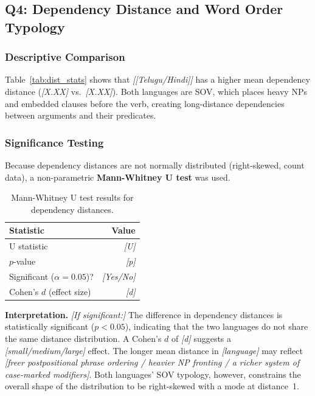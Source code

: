 \documentclass[12pt,a4paper]{article}
\newcommand{\placeholder}[1]{\textcolor{red!70!black}{\textit{[#1]}}}
\begin{document}
\subsection{Q4: Dependency Distance and Word Order Typology}

\subsubsection*{Descriptive Comparison}

Table~\ref{tab:dist_stats} shows that \placeholder{[Telugu/Hindi]} has a
higher mean dependency distance (\placeholder{X.XX} vs.\ \placeholder{X.XX}).
Both languages are SOV, which places heavy NPs and embedded clauses before the
verb, creating long-distance dependencies between arguments and their predicates.

\subsubsection*{Significance Testing}

Because dependency distances are not normally distributed (right-skewed, count
data), a non-parametric \textbf{Mann-Whitney U test} was used.

\begin{table}[H]
\centering
\caption{Mann-Whitney U test results for dependency distances.}
\begin{tabular}{lr}
\toprule
\textbf{Statistic} & \textbf{Value} \\
\midrule
U statistic & \placeholder{U} \\
$p$-value   & \placeholder{p} \\
Significant ($\alpha = 0.05$)? & \placeholder{Yes/No} \\
Cohen's $d$ (effect size) & \placeholder{d} \\
\bottomrule
\end{tabular}
\label{tab:signif}
\end{table}

\textbf{Interpretation.}
\placeholder{If significant:} The difference in dependency distances is
statistically significant ($p < 0.05$), indicating that the two languages do
not share the same distance distribution.  A Cohen's $d$ of \placeholder{d}
suggests a \placeholder{small/medium/large} effect.  The longer mean distance
in \placeholder{language} may reflect \placeholder{freer postpositional phrase
ordering / heavier NP fronting / a richer system of case-marked modifiers}.
Both languages' SOV typology, however, constrains the overall shape of the
distribution to be right-skewed with a mode at distance~1.
\end{document}
